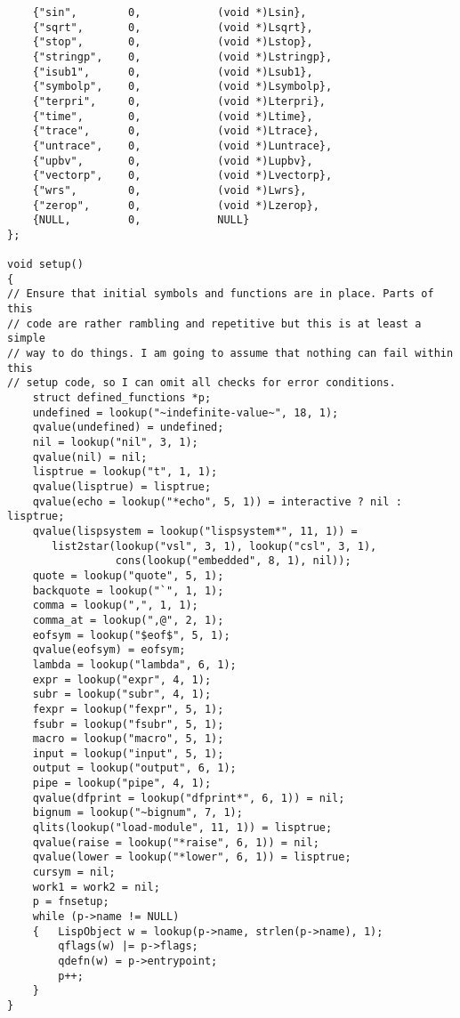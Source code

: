 {\begin{verbatim}
    {"sin",        0,            (void *)Lsin},
    {"sqrt",       0,            (void *)Lsqrt},
    {"stop",       0,            (void *)Lstop},
    {"stringp",    0,            (void *)Lstringp},
    {"isub1",      0,            (void *)Lsub1},
    {"symbolp",    0,            (void *)Lsymbolp},
    {"terpri",     0,            (void *)Lterpri},
    {"time",       0,            (void *)Ltime},
    {"trace",      0,            (void *)Ltrace},
    {"untrace",    0,            (void *)Luntrace},
    {"upbv",       0,            (void *)Lupbv},
    {"vectorp",    0,            (void *)Lvectorp},
    {"wrs",        0,            (void *)Lwrs},
    {"zerop",      0,            (void *)Lzerop},
    {NULL,         0,            NULL}
};

void setup()
{
// Ensure that initial symbols and functions are in place. Parts of this
// code are rather rambling and repetitive but this is at least a simple
// way to do things. I am going to assume that nothing can fail within this
// setup code, so I can omit all checks for error conditions.
    struct defined_functions *p;
    undefined = lookup("~indefinite-value~", 18, 1);
    qvalue(undefined) = undefined;
    nil = lookup("nil", 3, 1);
    qvalue(nil) = nil;
    lisptrue = lookup("t", 1, 1);
    qvalue(lisptrue) = lisptrue;
    qvalue(echo = lookup("*echo", 5, 1)) = interactive ? nil : lisptrue;
    qvalue(lispsystem = lookup("lispsystem*", 11, 1)) =
       list2star(lookup("vsl", 3, 1), lookup("csl", 3, 1),
                 cons(lookup("embedded", 8, 1), nil));
    quote = lookup("quote", 5, 1);
    backquote = lookup("`", 1, 1);
    comma = lookup(",", 1, 1);
    comma_at = lookup(",@", 2, 1);
    eofsym = lookup("$eof$", 5, 1);
    qvalue(eofsym) = eofsym;
    lambda = lookup("lambda", 6, 1);
    expr = lookup("expr", 4, 1);
    subr = lookup("subr", 4, 1);
    fexpr = lookup("fexpr", 5, 1);
    fsubr = lookup("fsubr", 5, 1);
    macro = lookup("macro", 5, 1);
    input = lookup("input", 5, 1);
    output = lookup("output", 6, 1);
    pipe = lookup("pipe", 4, 1);
    qvalue(dfprint = lookup("dfprint*", 6, 1)) = nil;
    bignum = lookup("~bignum", 7, 1);
    qlits(lookup("load-module", 11, 1)) = lisptrue;
    qvalue(raise = lookup("*raise", 6, 1)) = nil;
    qvalue(lower = lookup("*lower", 6, 1)) = lisptrue;
    cursym = nil;
    work1 = work2 = nil;
    p = fnsetup;
    while (p->name != NULL)
    {   LispObject w = lookup(p->name, strlen(p->name), 1);
        qflags(w) |= p->flags;
        qdefn(w) = p->entrypoint;
        p++;
    }
}


\end{verbatim}}
